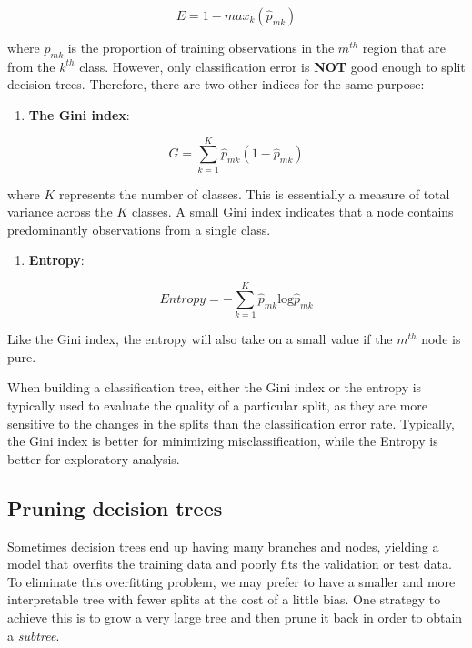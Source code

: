 \documentclass[]{book}
\providecommand{\tightlist}{%
  \setlength{\itemsep}{0pt}\setlength{\parskip}{0pt}}
\begin{document}
\[
E = 1 - max_k(\hat{p}_{mk})
\]

where \(\hat{p}_{mk}\) is the proportion of training observations in the \(m^{th}\) region that are from the \(k^{th}\) class. However, only classification error is \textbf{NOT} good enough to split decision trees. Therefore, there are two other indices for the same purpose:

\begin{enumerate}
\def\labelenumi{\arabic{enumi}.}
\tightlist
\item
  \textbf{The Gini index}:
\end{enumerate}

\[
G = \sum_{k=1}^{K}\hat{p}_{mk}(1-\hat{p}_{mk})
\]

where \(K\) represents the number of classes. This is essentially a measure of total variance across the \(K\) classes. A small Gini index indicates that a node contains predominantly observations from a single class.

\begin{enumerate}
\def\labelenumi{\arabic{enumi}.}
\setcounter{enumi}{1}
\tightlist
\item
  \textbf{Entropy}:
\end{enumerate}

\[
Entropy = -\sum_{k=1}^{K}\hat{p}_{mk}\text{log}\hat{p}_{mk}
\]

Like the Gini index, the entropy will also take on a small value if the \(m^{th}\) node is pure.

When building a classification tree, either the Gini index or the entropy is typically used to evaluate the quality of a particular split, as they are more sensitive to the changes in the splits than the classification error rate. Typically, the Gini index is better for minimizing misclassification, while the Entropy is better for exploratory analysis.

\hypertarget{pruning-decision-trees}{%
\subsection{Pruning decision trees}\label{pruning-decision-trees}}

Sometimes decision trees end up having many branches and nodes, yielding a model that overfits the training data and poorly fits the validation or test data. To eliminate this overfitting problem, we may prefer to have a smaller and more interpretable tree with fewer splits at the cost of a little bias. One strategy to achieve this is to grow a very large tree and then prune it back in order to obtain a \emph{subtree}.
\end{document}
